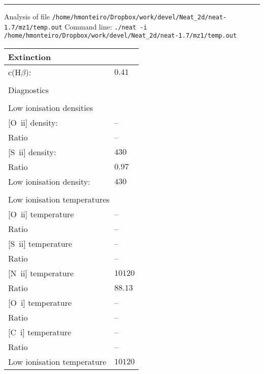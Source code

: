  \hrule
 \vspace{0.3cm}
 \noindent Analysis of file {\tt /home/hmonteiro/Dropbox/work/devel/Neat_2d/neat-1.7/mz1/temp.out}\newline
 \noindent Command line: {\tt ./neat -i /home/hmonteiro/Dropbox/work/devel/Neat_2d/neat-1.7/mz1/temp.out}\newline
 \begin{longtable}[l]{ll}
 \multicolumn{2}{l}{Extinction}\\ \hline
 c(H$\beta)$:                        & $  0.41$\\
 \vspace{0.2cm}\\\multicolumn{2}{l}{Diagnostics}\\ \hline
 \vspace{0.2cm}\\\multicolumn{2}{l}{Low ionisation densities}\\ \hline
 {}[O~{\sc ii}] density:             & -- \\
 Ratio                               & -- \\
 {}[S~{\sc ii}] density:             & $  430$\\
 Ratio                               & $  0.97$\\
 Low ionisation density:             & $  430$\\
 \vspace{0.2cm}\\\multicolumn{2}{l}{Low ionisation temperatures}\\ \hline
 {}[O~{\sc ii}] temperature          & -- \\
 Ratio                               & -- \\
 {}[S~{\sc ii}] temperature          & -- \\
 Ratio                               & -- \\
 {}[N~{\sc ii}] temperature          & $10120$\\
 Ratio                               & $ 88.13$\\
 {}[O~{\sc i}] temperature           & -- \\
 Ratio                               & -- \\
 {}[C~{\sc i}] temperature           & -- \\
 Ratio                               & -- \\
 Low ionisation temperature          & $10120$\\

\end{longtable}
